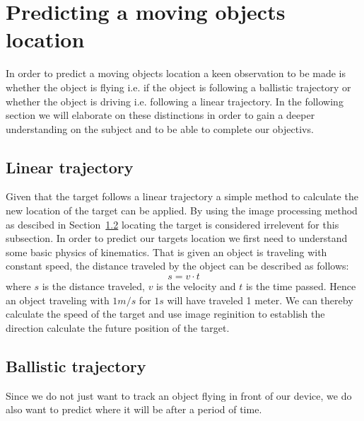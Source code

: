 \section{Predicting a moving objects location}
In order to predict a moving objects location a keen observation to be made is whether the object is flying i.e{.} if the object is following a ballistic trajectory or whether the object is driving i.e{.} following a linear trajectory. 
In the following section we will elaborate on these distinctions in order to gain a deeper understanding on the subject and to be able to complete our objectivs. 
\subsection{Linear trajectory}
Given that the target follows a linear trajectory a simple method to calculate the new location of the target can be applied. 
By using the image processing method as descibed in Section~\ref{} locating the target is considered irrelevent for this subsection. 
In order to predict our targets location we first need to understand some basic physics of kinematics. 
That is given an object is traveling with constant speed, the distance traveled by the object can be described as follows:
\begin{equation}
s = v \cdot t
\end{equation}
where $ s $ is the distance traveled, $ v $ is the velocity and $ t $ is the time passed.
Hence an object traveling with $ 1 m/s $ for $ 1 s $ will have traveled 1 meter. 
We can thereby calculate the speed of the target and use image reginition to establish the direction calculate the future position of the target. 


\subsection{Ballistic trajectory}
Since we do not just want to track an object flying in front of our device, we do also want to predict where it will be after a period of time. 
